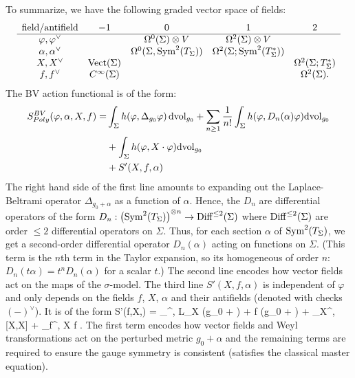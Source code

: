 To summarize, we have the following graded vector space of fields:
\[
\begin{array}{ccccc}
\text{field/antifield} & -1 &0 & 1 & 2\\
\hline
\varphi, \varphi^\vee & & \Omega^{0}(\Sigma) \otimes V & \Omega^2(\Sigma) \otimes V & \\
\alpha, \alpha^\vee & &  \Omega^0(\Sigma,{\rm Sym}^2(T_\Sigma)) & \Omega^2(\Sigma ; {\rm Sym}^{2}(T^*_\Sigma)) & \\
X, X^\vee & {\rm Vect}(\Sigma) & & & \Omega^2(\Sigma ; T^*_\Sigma)\\
f, f^\vee & C^\infty(\Sigma) &&& \Omega^2(\Sigma) .
\end{array}
\]
The BV action functional is of the form:
\begin{align}\label{polyakov bv}
S^{BV}_{Poly} (\varphi, \alpha, X, f) = 
& \int_\Sigma h(\varphi, \Delta_{g_0} \varphi)\, {\rm dvol}_{g_0} + \sum_{n \geq 1} \frac{1}{n!} \int_{\Sigma} h(\varphi, D_n(\alpha) \varphi) {\rm dvol}_{g_0} \\
& +  \int_{\Sigma} h(\varphi, X \cdot \varphi) {\rm dvol}_{g_0} \\
& +  S'(X, f, \alpha) 
\end{align}
The right hand side of the first line amounts to expanding out the Laplace-Beltrami operator $\Delta_{g_0 + \alpha}$ as a function of $\alpha$.
Hence, the $D_n$ are differential operators of the form 
$D_n : \left({\rm Sym}^2(T_\Sigma)\right)^{\otimes n} \to {\rm Diff}^{\leq 2} (\Sigma)$ 
where ${\rm Diff}^{\leq 2}(\Sigma)$ are order $\leq 2$ differential operators on $\Sigma$.
Thus, for each section $\alpha$ of ${\rm Sym}^2(T_\Sigma)$, we get a second-order differential operator $D_n(\alpha)$ acting on functions on $\Sigma$. (This term is the $n$th term in the Taylor expansion, so its homogeneous of order $n$: $D_n(t \alpha) = t^n D_n(\alpha)$ for a scalar $t$.)
The second line encodes how vector fields act on the maps of the $\sigma$-model.
The third line $S'(X, f, \alpha)$ is independent of $\varphi$
and only depends on the fields $f$, $X$, $\alpha$ and their antifields (denoted with checks $(-)^\vee$).
It is of the form
\ben
S'(f,X,\alpha) = \int_\Sigma \<\alpha^\vee, L_X (g_0 + \alpha) + f (g_0 + \alpha)\> + \int_\Sigma \<X^\vee, [X,X]\> + \int_\Sigma \<f^\vee, X \cdot f\> .
\een
The first term encodes how vector fields and Weyl transformations act on the perturbed metric $g_0 + \alpha$ and the remaining terms are required to ensure the gauge symmetry is consistent (satisfies the classical master equation). 

